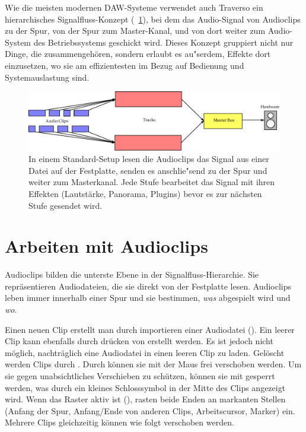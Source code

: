 Wie die meisten modernen DAW-Systeme verwendet auch Traverso ein hierarchisches Signalfluss-Konzept (\FigB~\ref{fig_routing01}), bei dem das Audio-Signal von Audioclips zu der Spur, von der Spur zum Master-Kanal, und von dort weiter zum Audio-System des Betriebssystems geschickt wird. Dieses Konzept gruppiert nicht nur Dinge, die zusammengehören, sondern erlaubt es au"serdem, Effekte dort einzusetzen, wo sie am effizientesten im Bezug auf Bedienung und Systemauslastung sind.

\begin{figure}[t]
 \centering\includegraphics[width=\textwidth]{../images/routing1}
 \caption{In einem Standard-Setup lesen die Audioclips das Signal aus einer Datei auf der Festplatte, senden es anschlie"send zu der Spur und weiter zum Masterkanal. Jede Stufe bearbeitet das Signal mit ihren Effekten (Lautstärke, Panorama, Plugins) bevor es zur nächsten Stufe gesendet wird.}
 \label{fig_routing01}
\end{figure}

\section{Arbeiten mit Audioclips}
Audioclips bilden die unterste Ebene in der Signalfluss-Hierarchie. Sie repräsentieren Audiodateien, die sie direkt von der Festplatte lesen. Audioclips leben immer innerhalb einer Spur und sie bestimmen, \emph{was} abgespielt wird und \emph{wo}.

Einen neuen Clip erstellt man durch importieren einer Audiodatei (). Ein leerer Clip kann ebenfalls durch drücken von  erstellt werden. Es ist jedoch nicht möglich, nachträglich eine Audiodatei in einen leeren Clip zu laden. Gelöscht werden Clips durch . Durch  können sie mit der Maus frei verschoben werden. Um sie gegen unabsichtliches Verschieben zu schützen, können sie mit  gesperrt werden, was durch ein kleines Schlosssymbol in der Mitte des Clips angezeigt wird. Wenn das Raster aktiv ist (), rasten beide Enden an markanten Stellen (Anfang der Spur, Anfang/Ende von anderen Clips, Arbeitscursor, Marker) ein. Mehrere Clips gleichzeitig können wie folgt verschoben werden.

